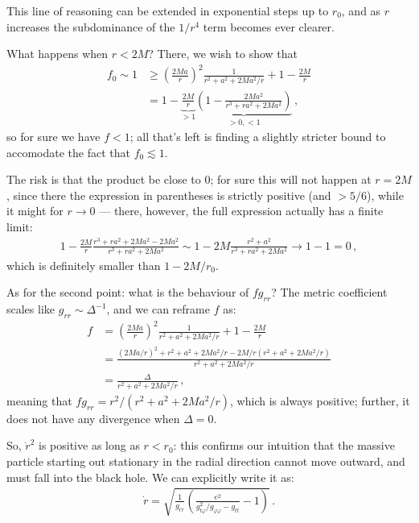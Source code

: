 \documentclass[main.tex]{subfiles}
\begin{document}
This line of reasoning can be extended in exponential steps up to \(r_0\), and as \(r\) increases the subdominance of the \(1/r^4 \) term becomes ever clearer.

What happens when \(r < 2M\)? There, we wish to show that 
%
\begin{align}
f_0 \sim 1 &\geq \left(\frac{2Ma}{r}\right)^2 \frac{1}{r^2 + a^2 + 2Ma^2 /r} + 1 - \frac{2M}{r}  \\
&= 1 - \underbrace{\frac{2M}{r}}_{> 1} \underbrace{\left( 1 - \frac{2Ma^2}{r^3 + ra^2 + 2Ma^2}\right)}_{>0, < 1}
\,,
\end{align}
%
so for sure we have \(f < 1\); all that's left is finding a slightly stricter bound to accomodate the fact that \(f_0 \lesssim 1\).

The risk is that the product be close to 0; for sure this will not happen at \(r = 2M\), since there the expression in parentheses is strictly positive (and \(>5/6\)), while it might for \(r \to 0\) --- there, however, the full expression actually has a finite limit: 
%
\begin{align}
1- \frac{2M}{r} \frac{r^3 + r a^2 + 2Ma^2 - 2Ma^2}{r^3+ r a^2 + 2Ma^2} 
\sim 1 - 2M \frac{r^2 + a^2}{r^3 + ra^2 + 2Ma^2} \to 1 - 1 = 0
\,,
\end{align}
%
which is definitely smaller than \(1 - 2M/r_0 \).

As for the second point: what is the behaviour of \(f g_{rr}\)? The metric coefficient scales like \(g_{rr} \sim \Delta^{-1}\), and we can reframe \(f\) as: 
%
\begin{align}
f &= \left(\frac{2Ma}{r}\right)^2 \frac{1}{r^2 + a^2 + 2Ma^2 /r} +1 - \frac{2M}{r}  \\
&= \frac{(2Ma/r)^2 + r^2 +a^2 + 2Ma^2/ r - 2M/r \left(r^2 + a^2 + 2Ma^2 / r\right)}{r^2 + a^2 + 2Ma^2 /r}  \\
&= \frac{\Delta }{r^2 + a^2 + 2Ma^2 /r}
\,,
\end{align}
%
meaning that \(f g_{rr} = r^2 / (r^2 + a^2 + 2Ma^2/r)\), which is always positive; further, it does not have any divergence when \(\Delta = 0\).



So, \(\dot{r}^2\) is positive as long as \(r < r_0 \): this confirms our intuition that the massive particle starting out stationary in the radial direction cannot move outward, and must fall into the black hole.
We can explicitly write it as:
%
\begin{align}
\dot{r} = \sqrt{\frac{1}{g_{rr}} \left( \frac{e^2}{g_{t \varphi }^2 / g_{\varphi \varphi } - g_{tt}} - 1\right)}
\,.
\end{align}
\end{document}
